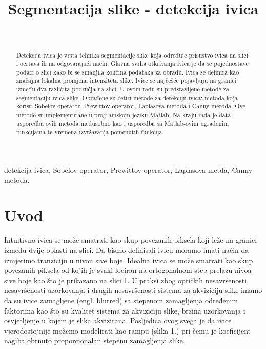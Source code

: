﻿\documentclass[conference]{IEEEtran}
\begin{document}
\title{Segmentacija slike - detekcija ivica}

\author{
\
}

\maketitle

\begin{abstract}
Detekcija ivica je vrsta tehnika segmentacije slike koja određuje prisustvo ivica na slici i ocrtava ih na odgovarajući način. Glavna svrha otkrivanja ivica je da se pojednostave podaci o slici kako bi se smanjila količina podataka za obradu. Ivica se definira kao značajna lokalna promjena intenziteta slike. Ivice se najčešće pojavljuju na granici između dva različita područja na slici. U ovom radu su predstavljene metode za segmentaciju ivica slike. Obrađene su  četiri metode za detekciju ivica: metoda koja koristi Sobelov operator, Prewittov operator, Laplasova metoda i Canny metoda. Ove metode su implementirane u programskom jeziku Matlab. Na kraju rada je data usporedba ovih metoda međusobno kao i usporedba sa Matlab-ovim ugrađenim funkcijama te vremena izvršavanja pomenutih funkcija.
\end{abstract}

\begin{IEEEkeywords}
detekcija ivica, Sobelov operator, Prewittov operator, Laplasova metda, Canny metoda.
\end{IEEEkeywords}

\section{Uvod}
Intuitivno ivica se može smatrati kao skup povezanih piksela koji leže na granici između dvije oblasti na slici. Da bismo definisali ivicu moramo imati način da izmjerimo tranziciju u nivou sive boje.   Idealna ivica se može smatrati kao skup povezanih piksela od kojih je svaki lociran na ortogonalnom step prelazu nivoa sive boje kao što je prikazano na slici 1. U praksi zbog optičkih nesavršenosti, nesavršenosti uzorkovanja i drugih nesavršenosti sistema za akviziciju slike imamo da su ivice zamagljene (engl. blurred) sa stepenom zamagljenja određenim faktorima kao što su kvalitet sistema za akviziciju slike, brzina uzorkovanja i osvjetljenje u kojem je slika akvizirana. Posljedica ovog svega je da ivice vjerodostojnije možemo modelirati kao rampu (slika 1.) pri čemu je koeficijent nagiba obrnuto proporcionalan
stepenu zamagljenja slike.
\end{document}
